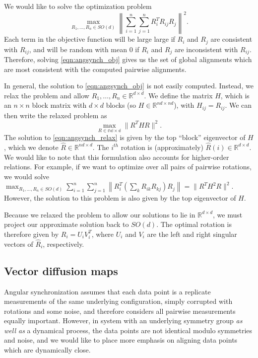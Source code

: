 \documentclass[10pt]{article}
\begin{document}
We would like to solve the optimization problem 
\begin{equation} \label{eqn:angsynch_obj}
\max_{R_1, \dots, R_n \in SO(d)} \left\| \sum_{i=1}^{n} \sum_{j=1}^{n} R_i^T R_{ij} R_j \right\|^2.
\end{equation}
%
Each term in the objective function will be large large if $R_i$ and $R_j$ are consistent with $R_{ij}$, and will be random with mean 0 if $R_i$ and $R_j$ are inconsistent with $R_{ij}$.
%
Therefore, solving \eqref{eqn:angsynch_obj} gives us the set of global alignments which are most consistent with the computed pairwise alignments.

In general, the solution to \eqref{eqn:angsynch_obj} is not easily computed.
%
Instead, we relax the problem and allow $R_1, \dots, R_n \in \mathbb{R}^{d \times d}$.
%
We define the matrix $H$, which is an $n \times n$ block matrix with $d \times d$ blocks (so $H \in \mathbb{R}^{nd \times nd}$), with $H_{ij} = R_{ij}$.
%
We can then write the relaxed problem as 
\begin{equation} \label{eqn:angsynch_relax}
\max_{R\in \mathbb{nd \times d}} \| R^T H R \|^2.
\end{equation}
%
The solution to \eqref{eqn:angsynch_relax} is given by the top ``block'' eigenvector of $H$, which we denote $\hat{R} \in \mathbb{R}^{nd \times d}$. 
%
The $i^{th}$ rotation is (approximately) $\hat{R}(i) \in \mathbb{R}^{d \times d}$.
%
We would like to note that this formulation also accounts for higher-order relations.
%
For example, if we want to optimize over all pairs of pairwise rotations, we would solve $\max_{R_1, \dots, R_n \in SO(d)} \sum_{i=1}^{n} \sum_{j=1}^{n} \left\| R_i^T \left( \sum_k R_{ik} R_{kj} \right) R_j \right\| = \| R^T H^2 R \|^2$. 
%
However, the solution to this problem is also given by the top eigenvector of $H$. 

Because we relaxed the problem to allow our solutions to lie in $\mathbb{R}^{d \times d}$, we must project our approximate solution back to $SO(d)$.
%
The optimal rotation is therefore given by $R_i = U_i V_i^T$, where $U_i$ and $V_i$ are the left and right singular vectors of $\hat{R}_i$, respectively. 

\subsection*{Vector diffusion maps} 

Angular synchronization assumes that each data point is a replicate measurements of the same underlying configuration, simply corrupted with rotations and some noise, and therefore considers all pairwise measurements equally important.
%
However, in system with an underlying symmetry group {\em as well as} a dynamical process, the data points are not identical modulo symmetries and noise, and we would like to place more emphasis on aligning data points which are dynamically close.
\end{document}
